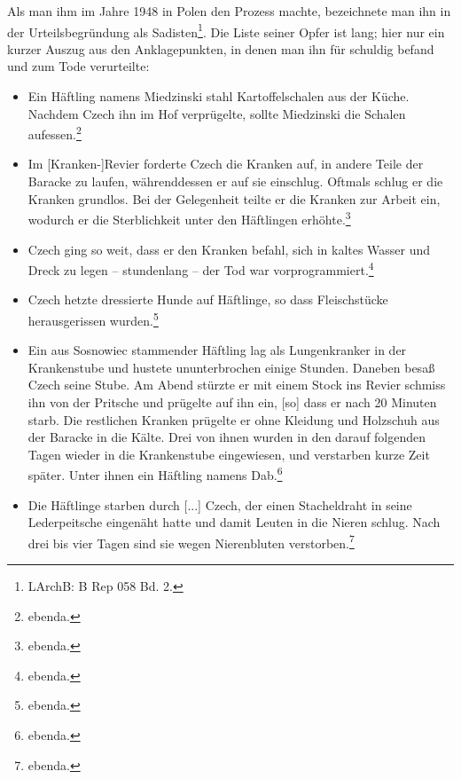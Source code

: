 Als man ihm im Jahre 1948 in Polen den Prozess machte, bezeichnete man ihn in der Urteilsbegründung als Sadisten\footnote{LArchB: B Rep 058 Bd. 2.}. Die Liste seiner Opfer ist lang; hier nur ein kurzer Auszug aus den Anklagepunkten, in denen man ihn für schuldig befand und zum Tode verurteilte:
\begin{itemize}
\item{\glqq Ein Häftling namens Miedzinski stahl Kartoffelschalen aus der Küche. Nachdem Czech ihn im Hof verprügelte, sollte Miedzinski die Schalen aufessen.\grqq\footnote{ebenda.}}

\item{\glqq Im [Kranken-]Revier forderte Czech die Kranken auf, in andere Teile der Baracke zu laufen, währenddessen er auf sie einschlug. Oftmals schlug er die Kranken grundlos. Bei der Gelegenheit teilte er die Kranken zur Arbeit ein, wodurch er die Sterblichkeit unter den Häftlingen erhöhte.\grqq\footnote{ebenda.}}

\item{\glqq Czech ging so weit, dass er den Kranken befahl, sich in kaltes Wasser und Dreck zu legen -- stundenlang -- der Tod war vorprogrammiert.\grqq\footnote{ebenda.}}

\item{\glqq Czech hetzte dressierte Hunde auf Häftlinge, so dass Fleischstücke herausgerissen wurden.\grqq\footnote{ebenda.}}

\item{\glqq Ein aus Sosnowiec stammender Häftling lag als Lungenkranker in der Krankenstube und hustete ununterbrochen einige Stunden. Daneben besaß Czech seine Stube. Am Abend stürzte er mit einem Stock ins Revier schmiss ihn von der Pritsche und prügelte auf ihn ein, [so] dass er nach 20 Minuten starb. Die restlichen Kranken prügelte er ohne Kleidung und Holzschuh aus der Baracke in die Kälte. Drei von ihnen wurden in den darauf folgenden Tagen wieder in die Krankenstube eingewiesen, und verstarben kurze Zeit später. Unter ihnen ein Häftling namens Dab.\grqq\footnote{ebenda.}}

\item{\glqq Die Häftlinge starben durch [...] Czech, der einen Stacheldraht in seine Lederpeitsche eingenäht hatte und damit Leuten in die Nieren schlug. Nach drei bis vier Tagen sind sie wegen Nierenbluten verstorben.\grqq\footnote{ebenda.}}

\end{itemize}

